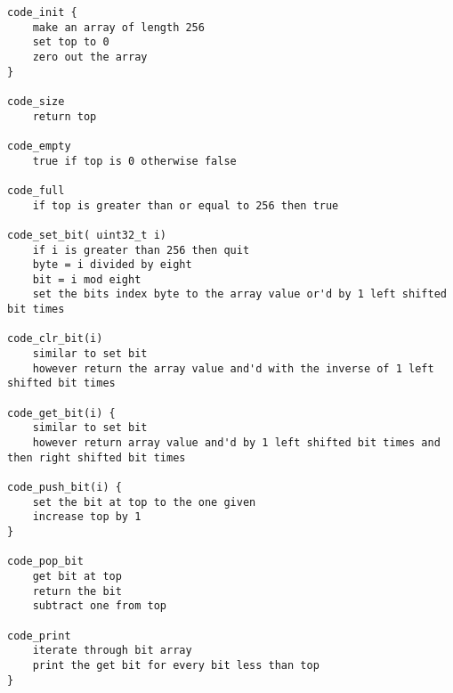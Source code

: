 \documentclass[11pt]{article}
\begin{document}
\begin{verbatim}
code_init { 
    make an array of length 256
    set top to 0
    zero out the array
}

code_size
    return top
    
code_empty
    true if top is 0 otherwise false
    
code_full
    if top is greater than or equal to 256 then true
    
code_set_bit( uint32_t i)
    if i is greater than 256 then quit
    byte = i divided by eight
    bit = i mod eight
    set the bits index byte to the array value or'd by 1 left shifted bit times
    
code_clr_bit(i)
    similar to set bit
    however return the array value and'd with the inverse of 1 left shifted bit times

code_get_bit(i) {
    similar to set bit
    however return array value and'd by 1 left shifted bit times and then right shifted bit times
    
code_push_bit(i) {
    set the bit at top to the one given
    increase top by 1
}

code_pop_bit
    get bit at top
    return the bit
    subtract one from top

code_print
    iterate through bit array
    print the get bit for every bit less than top
}
\end{verbatim}
\end{document}
